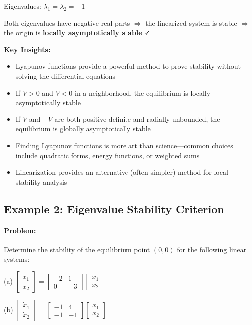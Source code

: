 \documentclass[11pt,a4paper]{article}
\begin{document}
Eigenvalues: $\lambda_1 = \lambda_2 = -1$

Both eigenvalues have negative real parts $\Rightarrow$ the linearized system is stable $\Rightarrow$ the origin is \textbf{locally asymptotically stable} ✓

\textbf{Key Insights:}
\begin{itemize}
\item Lyapunov functions provide a powerful method to prove stability without solving the differential equations
\item If $V > 0$ and $\dot{V} < 0$ in a neighborhood, the equilibrium is locally asymptotically stable
\item If $V$ and $-\dot{V}$ are both positive definite and radially unbounded, the equilibrium is globally asymptotically stable
\item Finding Lyapunov functions is more art than science—common choices include quadratic forms, energy functions, or weighted sums
\item Linearization provides an alternative (often simpler) method for local stability analysis
\end{itemize}

\subsection{Example 2: Eigenvalue Stability Criterion}

\paragraph{Problem:} Determine the stability of the equilibrium point $(0, 0)$ for the following linear systems:

(a) $\begin{bmatrix} \dot{x}_1 \\ \dot{x}_2 \end{bmatrix} = \begin{bmatrix} -2 & 1 \\ 0 & -3 \end{bmatrix}\begin{bmatrix} x_1 \\ x_2 \end{bmatrix}$

(b) $\begin{bmatrix} \dot{x}_1 \\ \dot{x}_2 \end{bmatrix} = \begin{bmatrix} -1 & 4 \\ -1 & -1 \end{bmatrix}\begin{bmatrix} x_1 \\ x_2 \end{bmatrix}$
\end{document}
